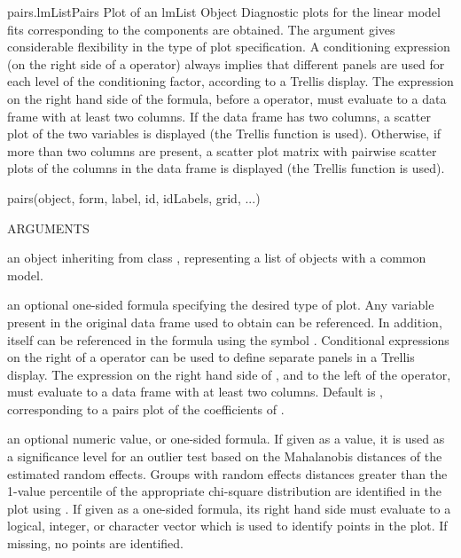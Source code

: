 \documentclass[pdftex]{article} \usepackage{url,graphicx}
\renewcommand{\Twiddle}{\mbox{\(\sim\)}}
\begin{document}
\begin{Helpfile}{pairs.lmList}{Pairs Plot of an lmList Object}
Diagnostic plots for the linear model fits corresponding to the
  components  are obtained. The  argument
gives considerable  flexibility in the type of plot specification. A
conditioning  expression (on the right side of a \Co{|} operator)
always implies  that different panels are used for  each level of the
conditioning  factor, according to a Trellis display. The expression
on the right  hand side of the formula, before a \Co{|} operator,
must evaluate to  a data frame with at least two columns. If the data
frame has two  columns, a scatter plot of the two variables is
displayed (the Trellis  function  is used). Otherwise, if
more than two columns  are present, a scatter plot matrix with
pairwise scatter plots of the  columns in the data frame is displayed
(the Trellis function   is used).
\begin{Example}
pairs(object, form, label, id, idLabels, grid, ...)
\end{Example}
\begin{Argument}{ARGUMENTS}
\item[\Co{object:}]
an object inheriting from class , representing
a list of  objects with a common model.
\item[\Co{form:}]
an optional one-sided formula specifying the desired type of
plot. Any variable present in the original data frame used to obtain
 can be referenced. In addition,  itself
can be referenced in the formula using the symbol
. Conditional expressions on the right of a \Co{|}
operator can be used to define separate panels in a Trellis
display. The expression on the right hand side of , and to
the left of the \Co{|} operator, must evaluate to a data frame with
at least two columns. Default is \Co{{\Twiddle} coef(.)}, corresponding to
a pairs plot of the coefficients of .
\item[\Co{id:}]
an optional numeric value, or one-sided formula. If given as
a value, it is used as a significance level for an outlier
test based on the Mahalanobis distances of the estimated random
effects. Groups with random effects distances greater than the
1-value percentile of the appropriate chi-square distribution
are identified in the plot using . If given as a
one-sided formula, its right hand side must evaluate to a  logical,
integer, or character vector which is used to identify points in the
plot. If missing, no points are identified.

\end{Argument}
\end{Helpfile}
\end{document}
